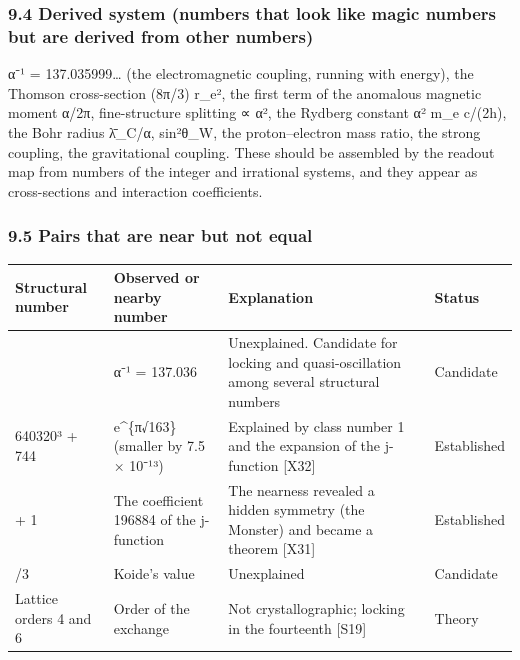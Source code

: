 \documentclass[
  a4paper,
]{article}
\newcounter{none} %
\begin{document}
\subsubsection{9.4 Derived system (numbers that look like magic numbers
but are derived from other
numbers)}\label{derived-system-numbers-that-look-like-magic-numbers-but-are-derived-from-other-numbers}

α⁻¹ = 137.035999\ldots{} (the electromagnetic coupling, running with
energy), the Thomson cross-section (8π/3) r\_e², the first term of the
anomalous magnetic moment α/2π, fine-structure splitting ∝ α², the
Rydberg constant α² m\_e c/(2h), the Bohr radius λ̄\_C/α, sin²θ\_W, the
proton--electron mass ratio, the strong coupling, the gravitational
coupling. These should be assembled by the readout map from numbers of
the integer and irrational systems, and they appear as cross-sections
and interaction coefficients.

\subsubsection{9.5 Pairs that are near but not
equal}\label{pairs-that-are-near-but-not-equal}

{\def\LTcaptype{none} %
\begin{longtable}[]{@{}
  >{\raggedright\arraybackslash}p{}
  >{\raggedright\arraybackslash}p{}
  >{\raggedright\arraybackslash}p{}
  >{\raggedright\arraybackslash}p{}@{}}
\toprule\noalign{}
\begin{minipage}[b]{\linewidth}\raggedright
Structural number
\end{minipage} & \begin{minipage}[b]{\linewidth}\raggedright
Observed or nearby number
\end{minipage} & \begin{minipage}[b]{\linewidth}\raggedright
Explanation
\end{minipage} & \begin{minipage}[b]{\linewidth}\raggedright
Status
\end{minipage} \\
\midrule\noalign{}
\endhead
\bottomrule\noalign{}
\endlastfoot
137 & α⁻¹ = 137.036 & Unexplained. Candidate for locking and
quasi-oscillation among several structural numbers & Candidate \\
640320³ + 744 & e\^{}\{π√163\} (smaller by 7.5 × 10⁻¹³) & Explained by
class number 1 and the expansion of the j-function {[}X32{]} &
Established \\
196883 + 1 & The coefficient 196884 of the j-function & The nearness
revealed a hidden symmetry (the Monster) and became a theorem {[}X31{]}
& Established \\
2/3 & Koide's value & Unexplained & Candidate \\
Lattice orders 4 and 6 & Order of the exchange & Not crystallographic;
locking in the fourteenth {[}S19{]} & Theory \\
\end{longtable}
}
\end{document}
